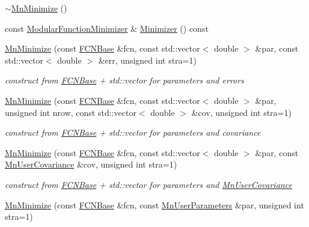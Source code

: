 \begin{DoxyCompactItemize}
\item 
\mbox{\hyperlink{classROOT_1_1Minuit2_1_1MnMinimize_ae4544af29d79b1415179ce48c05b9ae0}{$\sim$\+Mn\+Minimize}} ()
\item 
const \mbox{\hyperlink{classROOT_1_1Minuit2_1_1ModularFunctionMinimizer}{Modular\+Function\+Minimizer}} \& \mbox{\hyperlink{classROOT_1_1Minuit2_1_1MnMinimize_a879bb789f98c72f9a90a327fc7bb48fd}{Minimizer}} () const
\item 
\mbox{\hyperlink{classROOT_1_1Minuit2_1_1MnMinimize_ab556cdc37be07557d060aa179a7e0d1f}{Mn\+Minimize}} (const \mbox{\hyperlink{classROOT_1_1Minuit2_1_1FCNBase}{F\+C\+N\+Base}} \&fcn, const std\+::vector$<$ double $>$ \&par, const std\+::vector$<$ double $>$ \&err, unsigned int stra=1)
\begin{DoxyCompactList}\small\item\em construct from \mbox{\hyperlink{classROOT_1_1Minuit2_1_1FCNBase}{F\+C\+N\+Base}} + std\+::vector for parameters and errors \end{DoxyCompactList}\item 
\mbox{\hyperlink{classROOT_1_1Minuit2_1_1MnMinimize_ad6015768309e01c6610185006008b2d5}{Mn\+Minimize}} (const \mbox{\hyperlink{classROOT_1_1Minuit2_1_1FCNBase}{F\+C\+N\+Base}} \&fcn, const std\+::vector$<$ double $>$ \&par, unsigned int nrow, const std\+::vector$<$ double $>$ \&cov, unsigned int stra=1)
\begin{DoxyCompactList}\small\item\em construct from \mbox{\hyperlink{classROOT_1_1Minuit2_1_1FCNBase}{F\+C\+N\+Base}} + std\+::vector for parameters and covariance \end{DoxyCompactList}\item 
\mbox{\hyperlink{classROOT_1_1Minuit2_1_1MnMinimize_a4cf2e37839cc454720ab3bd8041dffa9}{Mn\+Minimize}} (const \mbox{\hyperlink{classROOT_1_1Minuit2_1_1FCNBase}{F\+C\+N\+Base}} \&fcn, const std\+::vector$<$ double $>$ \&par, const \mbox{\hyperlink{classROOT_1_1Minuit2_1_1MnUserCovariance}{Mn\+User\+Covariance}} \&cov, unsigned int stra=1)
\begin{DoxyCompactList}\small\item\em construct from \mbox{\hyperlink{classROOT_1_1Minuit2_1_1FCNBase}{F\+C\+N\+Base}} + std\+::vector for parameters and \mbox{\hyperlink{classROOT_1_1Minuit2_1_1MnUserCovariance}{Mn\+User\+Covariance}} \end{DoxyCompactList}\item 
\mbox{\hyperlink{classROOT_1_1Minuit2_1_1MnMinimize_a0d930638a3d23f7ca1a8dc3f016a4730}{Mn\+Minimize}} (const \mbox{\hyperlink{classROOT_1_1Minuit2_1_1FCNBase}{F\+C\+N\+Base}} \&fcn, const \mbox{\hyperlink{classROOT_1_1Minuit2_1_1MnUserParameters}{Mn\+User\+Parameters}} \&par, unsigned int stra=1)

\end{DoxyCompactItemize}
